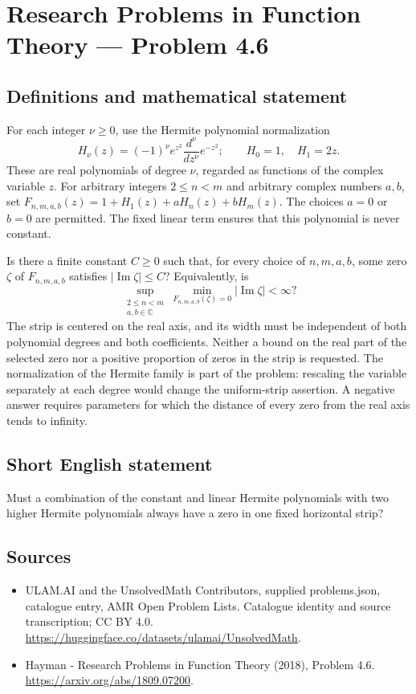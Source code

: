 \documentclass[11pt,a4paper]{article}
\begin{document}
\section*{Research Problems in Function Theory — Problem 4.6}\label{statement}

\subsection{Definitions and mathematical statement}
For each integer $\nu\geq0$, use the Hermite polynomial normalization
\[
 H_\nu(z)=(-1)^\nu e^{z^2}
                \frac{d^\nu}{dz^\nu}e^{-z^2};
 \qquad H_0=1,\quad H_1=2z.
\]
These are real polynomials of degree $\nu$, regarded as functions of
the complex variable $z$. For arbitrary integers $2\leq n<m$ and
arbitrary complex numbers $a,b$, set
$F_{n,m,a,b}(z)=1+H_1(z)+aH_n(z)+bH_m(z)$.
The choices $a=0$ or $b=0$ are permitted. The fixed linear term
ensures that this polynomial is never constant.

Is there a finite constant $C\geq0$ such that, for every choice of
$n,m,a,b$, some zero $\zeta$ of $F_{n,m,a,b}$ satisfies
$|\operatorname{Im}\zeta|\leq C$? Equivalently, is
\[
 \sup_{\substack{2\leq n<m\\a,b\in\mathbb C}}
     \min_{F_{n,m,a,b}(\zeta)=0}|\operatorname{Im}\zeta|<\infty?
\]
The strip is centered on the real axis, and its width must be
independent of both polynomial degrees and both coefficients.
Neither a bound on the real part of the selected zero nor a
positive proportion of zeros in the strip is requested.
The normalization of the Hermite family is part of the problem:
rescaling the variable separately at each degree would change the
uniform-strip assertion. A negative answer requires parameters for
which the distance of every zero from the real axis tends to infinity.
\subsection{Short English statement}
Must a combination of the constant and linear Hermite polynomials with two higher Hermite polynomials always have a zero in one fixed horizontal strip?
\subsection{Sources}
\begin{itemize}
\item[S1] ULAM.AI and the UnsolvedMath Contributors, supplied problems.json, catalogue entry, AMR Open Problem Lists. Catalogue identity and source transcription; CC BY 4.0.
\url{https://huggingface.co/datasets/ulamai/UnsolvedMath}.
\item[S2] Hayman - Research Problems in Function Theory (2018), Problem 4.6. 
\url{https://arxiv.org/abs/1809.07200}.
\end{itemize}
\end{document}
